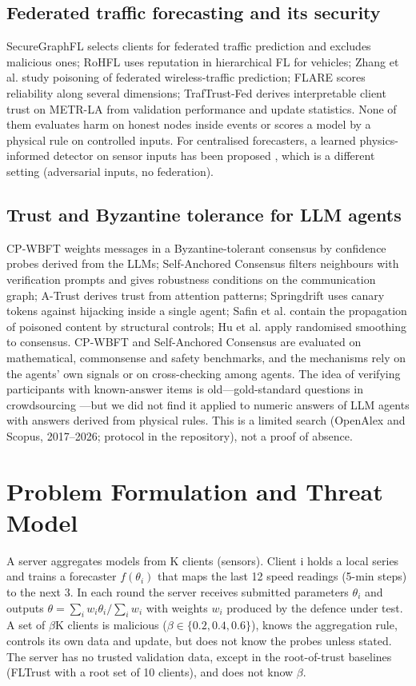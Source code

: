 \documentclass[journal]{IEEEtran}
\begin{document}
\subsection{Federated traffic forecasting and its security}
SecureGraphFL \cite{securegraphfl} selects clients for federated traffic prediction and excludes malicious ones; RoHFL \cite{rohfl} uses reputation in hierarchical FL for vehicles; Zhang et al. \cite{wireless} study poisoning of federated wireless-traffic prediction; FLARE \cite{flare} scores reliability along several dimensions; TrafTrust-Fed \cite{traftrust} derives interpretable client trust on METR-LA from validation performance and update statistics. None of them evaluates harm on honest nodes inside events or scores a model by a physical rule on controlled inputs. For centralised forecasters, a learned physics-informed detector on sensor inputs has been proposed \cite{vettraffic}, which is a different setting (adversarial inputs, no federation).

\subsection{Trust and Byzantine tolerance for LLM agents}
CP-WBFT \cite{cpwbft} weights messages in a Byzantine-tolerant consensus by confidence probes derived from the LLMs; Self-Anchored Consensus \cite{sac} filters neighbours with verification prompts and gives robustness conditions on the communication graph; A-Trust \cite{atrust} derives trust from attention patterns; Springdrift \cite{springdrift} uses canary tokens against hijacking inside a single agent; Safin et al. \cite{trustprop} contain the propagation of poisoned content by structural controls; Hu et al. \cite{rsmooth} apply randomised smoothing to consensus. CP-WBFT and Self-Anchored Consensus are evaluated on mathematical, commonsense and safety benchmarks, and the mechanisms rely on the agents' own signals or on cross-checking among agents. The idea of verifying participants with known-answer items is old---gold-standard questions in crowdsourcing \cite{snow}---but we did not find it applied to numeric answers of LLM agents with answers derived from physical rules. This is a limited search (OpenAlex and Scopus, 2017--2026; protocol in the repository), not a proof of absence.

\section{Problem Formulation and Threat Model}
A server aggregates models from K clients (sensors). Client i holds a local series and trains a forecaster $f(\theta_i)$ that maps the last 12 speed readings (5-min steps) to the next 3. In each round the server receives submitted parameters $\theta_{i}$ and outputs $\theta=\sum_i w_i\theta_i\big/\sum_i w_i$ with weights $w_{i}$ produced by the defence under test. A set of \ensuremath{\beta}K clients is malicious ($\beta\in\{0.2,0.4,0.6\}$), knows the aggregation rule, controls its own data and update, but does not know the probes unless stated. The server has no trusted validation data, except in the root-of-trust baselines (FLTrust with a root set of 10 clients), and does not know \ensuremath{\beta}.
\end{document}
